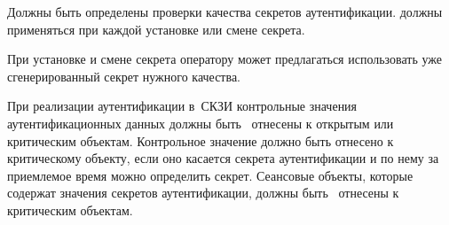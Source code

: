 \label{R.IA.PwdSet} %
Должны быть определены  проверки качества 
секретов аутентификации.  должны применяться при каждой 
установке или смене секрета.

\begin{note}
При установке и смене секрета оператору может предлагаться использовать
уже сгенерированный секрет нужного качества.
\end{note}

\label{R.IA.AuthProtect} %
При реализации  аутентификации в~СКЗИ контрольные значения 
аутентификационных данных должны быть~ отнесены к открытым
или критическим объектам.
%
Контрольное значение должно быть отнесено к критическому объекту, 
если оно касается секрета аутентификации и по нему за приемлемое
время можно определить секрет.
%
Сеансовые объекты, которые содержат значения секретов аутентификации,
должны быть~ отнесены к критическим объектам.


